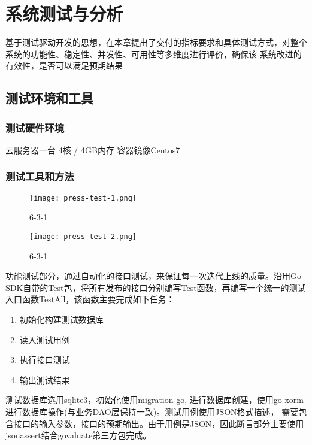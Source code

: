 
\chapter{系统测试与分析}
基于测试驱动开发的思想，在本章提出了交付的指标要求和具体测试方式，对整个系统的功能性、稳定性、并发性、可用性等多维度进行评价，确保该
系统改进的有效性，是否可以满足预期结果

\section{测试环境和工具}

\subsection{测试硬件环境}
云服务器一台
4核 / 4GB内存
容器镜像Centos7

\subsection{测试工具和方法}

\begin{figure}[H]
    \centering
    \texttt{[image: press-test-1.png]}
    \caption{6-3-1}
    \label{fig:6-1-1}
\end{figure}

\begin{figure}[H]
    \centering
    \texttt{[image: press-test-2.png]}
    \caption{6-3-1}
    \label{fig:6-1-2}
\end{figure}

功能测试部分，通过自动化的接口测试，来保证每一次迭代上线的质量。沿用Go SDK自带的Test包，将所有发布的接口分别编写Test函数，再编写一个统一的测试
入口函数TestAll，该函数主要完成如下任务：
\begin{enumerate}
    \item 初始化构建测试数据库
    \item 读入测试用例
    \item 执行接口测试
    \item 输出测试结果
\end{enumerate}

测试数据库选用sqlite3，初始化使用migration-go, 进行数据库创建，使用go-xorm进行数据库操作(与业务DAO层保持一致)。测试用例使用JSON格式描述，
需要包含接口的输入参数，接口的预期输出。由于用例是JSON，因此断言部分主要使用jsonassert结合govaluate第三方包完成。

